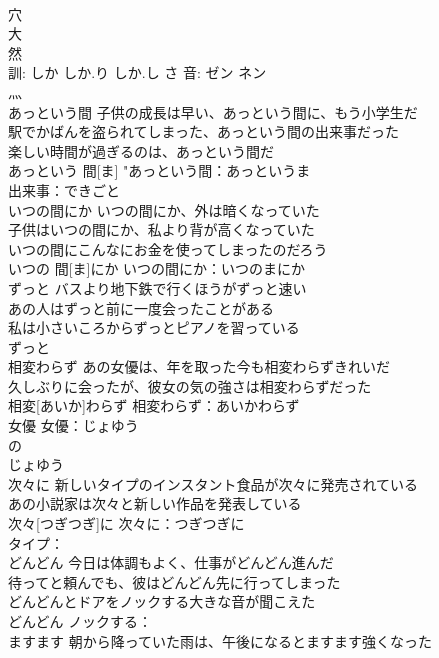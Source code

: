 \documentclass[8pt]{extreport}
\begin{document}
\begin{CJK}{UTF8}{min}
\\	穴 
\\	大 
\\	然 
\\	訓: しか しか.り しか.し さ 音: ゼン ネン 
\\	灬 
\\	あっという間	子供の成長は早い、あっという間に、もう小学生だ 
\\	駅でかばんを盗られてしまった、あっという間の出来事だった 
\\	楽しい時間が過ぎるのは、あっという間だ 
\\	あっという 間[ま]			"あっという間：あっというま 
\\	出来事：できごと
\\	いつの間にか	いつの間にか、外は暗くなっていた 
\\	子供はいつの間にか、私より背が高くなっていた 
\\	いつの間にこんなにお金を使ってしまったのだろう 
\\	いつの 間[ま]にか			いつの間にか：いつのまにか
\\	ずっと	バスより地下鉄で行くほうがずっと速い 
\\	あの人はずっと前に一度会ったことがある 
\\	私は小さいころからずっとピアノを習っている 
\\	ずっと						
\\	相変わらず	あの女優は、年を取った今も相変わらずきれいだ 
\\	久しぶりに会ったが、彼女の気の強さは相変わらずだった 
\\	相変[あいか]わらず			相変わらず：あいかわらず
\\	女優 女優：じょゆう
\\	の 
\\	じょゆう			
\\	次々に	新しいタイプのインスタント食品が次々に発売されている 
\\	あの小説家は次々と新しい作品を発表している 
\\	次々[つぎつぎ]に			次々に：つぎつぎに
\\	タイプ：
\\	どんどん	今日は体調もよく、仕事がどんどん進んだ 
\\	待ってと頼んでも、彼はどんどん先に行ってしまった 
\\	どんどんとドアをノックする大きな音が聞こえた 
\\	どんどん			ノックする：
\\	ますます	朝から降っていた雨は、午後になるとますます強くなった 

\end{CJK}
\end{document}
